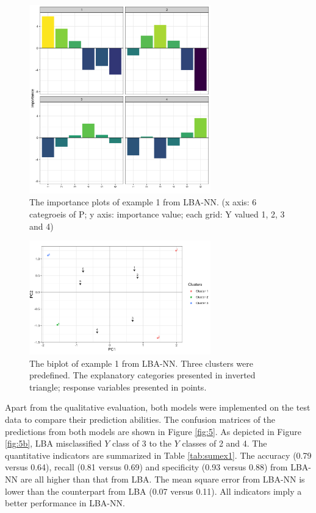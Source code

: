 \documentclass[]{interact}
\theoremstyle{plain}%
\theoremstyle{definition}
\theoremstyle{remark}
\begin{document}
\begin{figure}[H]
\centering
\includegraphics[width=0.7\textwidth]{figure/3_importance_plot_example_1.png}
\caption{The importance plots of example 1 from LBA-NN. (x axis: 6 categroeis of P; y axis: importance value; each grid: Y valued 1, 2, 3 and 4) \label{fig:impex1}}
\end{figure}

\begin{figure}[H]
\centering
\includegraphics[width=0.7\textwidth]{figure/4_biplot_example_1.png}
\caption{The biplot of example 1 from LBA-NN. Three clusters were predefined. The explanatory categories presented in inverted triangle; response variables presented in points.
\label{fig:bipex1}}
\end{figure}

Apart from the qualitative evaluation, both models were implemented on
the test data to compare their prediction abilities. The confusion
matrices of the predictions from both models are shown in Figure
\ref{fig:5}. As depicted in Figure \ref{fig:5b}, LBA misclassified \(Y\)
class of 3 to the \(Y\) classes of 2 and 4. The quantitative indicators
are summarized in Table \ref{tab:sumex1}. The accuracy (0.79 versus
0.64), recall (0.81 versus 0.69) and specificity (0.93 versus 0.88) from
LBA-NN are all higher than that from LBA. The mean square error from
LBA-NN is lower than the counterpart from LBA (0.07 versus 0.11). All
indicators imply a better performance in LBA-NN.
\end{document}
